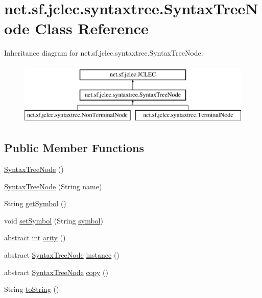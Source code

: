 \hypertarget{classnet_1_1sf_1_1jclec_1_1syntaxtree_1_1_syntax_tree_node}{\section{net.\-sf.\-jclec.\-syntaxtree.\-Syntax\-Tree\-Node Class Reference}
\label{classnet_1_1sf_1_1jclec_1_1syntaxtree_1_1_syntax_tree_node}
}
Inheritance diagram for net.\-sf.\-jclec.\-syntaxtree.\-Syntax\-Tree\-Node\-:\begin{figure}[H]
\begin{center}
\leavevmode
\includegraphics[height=3.000000cm]{classnet_1_1sf_1_1jclec_1_1syntaxtree_1_1_syntax_tree_node}
\end{center}
\end{figure}
\subsection*{Public Member Functions}
\begin{DoxyCompactItemize}
\item 
\hyperlink{classnet_1_1sf_1_1jclec_1_1syntaxtree_1_1_syntax_tree_node_a362c84af08d526999846f2a7fed7f3c7}{Syntax\-Tree\-Node} ()
\item 
\hyperlink{classnet_1_1sf_1_1jclec_1_1syntaxtree_1_1_syntax_tree_node_ab726dc7c2b98a33839745cb2ac52c3a6}{Syntax\-Tree\-Node} (String name)
\item 
String \hyperlink{classnet_1_1sf_1_1jclec_1_1syntaxtree_1_1_syntax_tree_node_a09b1a2707575bbcaac785cf62ab6a9c5}{get\-Symbol} ()
\item 
void \hyperlink{classnet_1_1sf_1_1jclec_1_1syntaxtree_1_1_syntax_tree_node_a65c4a9f11c9c3e7f0f95957c2cead13d}{set\-Symbol} (String \hyperlink{classnet_1_1sf_1_1jclec_1_1syntaxtree_1_1_syntax_tree_node_a278880a5e241931f593f51c8a599d200}{symbol})
\item 
abstract int \hyperlink{classnet_1_1sf_1_1jclec_1_1syntaxtree_1_1_syntax_tree_node_a2703e13df823f33701bcf4c473bb6fa4}{arity} ()
\item 
abstract \hyperlink{classnet_1_1sf_1_1jclec_1_1syntaxtree_1_1_syntax_tree_node}{Syntax\-Tree\-Node} \hyperlink{classnet_1_1sf_1_1jclec_1_1syntaxtree_1_1_syntax_tree_node_adc029084c59138e45df2b27c2806d128}{instance} ()
\item 
abstract \hyperlink{classnet_1_1sf_1_1jclec_1_1syntaxtree_1_1_syntax_tree_node}{Syntax\-Tree\-Node} \hyperlink{classnet_1_1sf_1_1jclec_1_1syntaxtree_1_1_syntax_tree_node_add010a8e455241f1eca244441c069264}{copy} ()
\item 
String \hyperlink{classnet_1_1sf_1_1jclec_1_1syntaxtree_1_1_syntax_tree_node_a77d24101c6731d297f9cbca271ffb0f2}{to\-String} ()
\end{DoxyCompactItemize}
